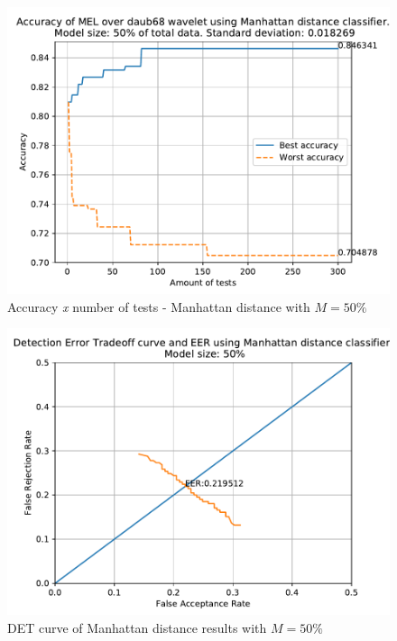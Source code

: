 	
		\begin{figure}[H]
			\centering
			\includegraphics[scale=.8]{images/results/confusionMatrices/classifier_Manhattan_50.pdf}
			\caption{Accuracy \textit{x} number of tests - Manhattan distance with $M=50\%$}
			\label{fig:classifiermanhattan50}
		\end{figure}
		\begin{figure}[H]
			\centering
			\includegraphics[scale=.8]{images/results/det/DET_for_classifier_Manhattan_50.pdf}
			\caption{DET curve of Manhattan distance results with $M=50\%$}
			\label{fig:detforclassifiermanhattan50}
		\end{figure}
	

